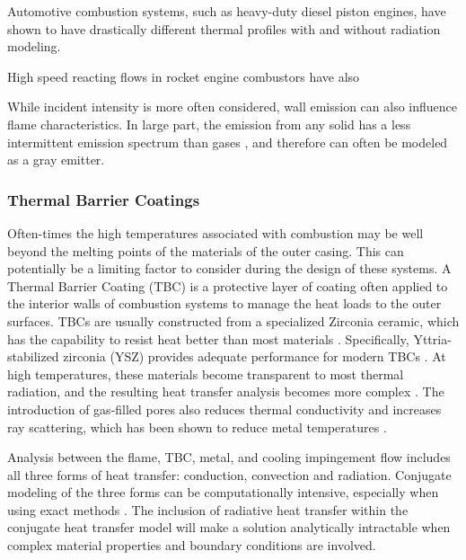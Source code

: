 Automotive combustion systems, such as heavy-duty diesel piston engines, have shown to have drastically different thermal profiles with and without radiation modeling. 

High speed reacting flows in rocket engine combustors have also 


While incident intensity is more often considered, wall emission can also influence flame characteristics. In large part, the emission from any solid has a less intermittent emission spectrum than gases \cite{Liu2020TheFlames,Howell2010ThermalTransfer}, and therefore can often be modeled as a gray emitter.



\subsubsection{Thermal Barrier Coatings}
Often-times the high temperatures associated with combustion may be well beyond the melting points of the materials of the outer casing. This can potentially be a limiting factor to consider during the design of these systems.
A Thermal Barrier Coating (TBC) is a protective layer of coating often applied to the interior walls of combustion systems to manage the heat loads to the outer surfaces. 
TBCs are usually constructed from a specialized Zirconia ceramic, which has the capability to resist heat
better than most materials \cite{Miller1997ThermalDirections}. Specifically, Yttria-stabilized zirconia (YSZ) provides adequate performance for modern TBCs \cite{Padture2002ThermalApplications}. At high temperatures, these materials become transparent to most thermal radiation, and the resulting heat transfer analysis becomes more complex \cite{Howell2010ThermalTransfer, Siegel1998AnalysisCoatings}. The
introduction of gas-filled pores also reduces thermal conductivity and increases ray scattering, which has been shown to reduce metal temperatures \cite{Boissonnet2019EvolutionTemperature,Spuckler1996Two-FluxLayers}.

Analysis between the flame, TBC, metal, and cooling impingement flow includes all three forms of heat
transfer: conduction, convection and radiation. Conjugate modeling of the three forms can be computationally intensive, especially when using exact methods \cite{Viskanta1975HeatSolids}. 
The inclusion of radiative heat transfer within the conjugate heat transfer model will make a solution analytically intractable when complex material properties and boundary conditions are involved.

